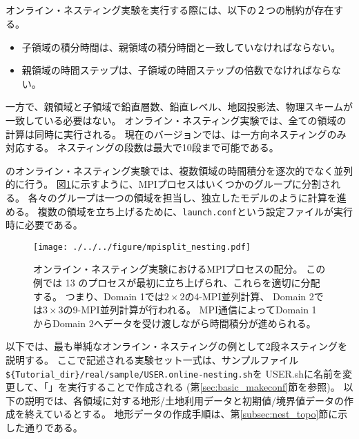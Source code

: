 \subsection{\SubsecOnlineNesting} \label{subsec:nest_online}

オンライン・ネスティング実験を実行する際には、以下の２つの制約が存在する。
\begin{itemize}
\item 子領域の積分時間は、親領域の積分時間と一致していなければならない。
\item 親領域の時間ステップは、子領域の時間ステップの倍数でなければならない。
\end{itemize}
一方で、親領域と子領域で鉛直層数、鉛直レベル、地図投影法、物理スキームが一致している必要はない。
オンライン・ネスティング実験では、全ての領域の計算は同時に実行される。
現在のバージョンでは、\scalerm は一方向ネスティングのみ対応する。
ネスティングの段数は最大で10段まで可能である。

\scalerm のオンライン・ネスティング実験では、複数領域の時間積分を逐次的でなく並列的に行う。
図\ref{fig_mpisplit}に示すように、MPIプロセスはいくつかのグループに分割される。
各々のグループは一つの領域を担当し、独立したモデルのように計算を進める。
複数の領域を立ち上げるために、\verb|launch.conf|という設定ファイルが実行時に必要である。

\begin{figure}[ht]
\begin{center}
  \texttt{[image: ./../../figure/mpisplit\_nesting.pdf]}\\
  \caption{ オンライン・ネスティング実験におけるMPIプロセスの配分。
           この例では 13 のプロセスが最初に立ち上げられ、これらを適切に分配する。
           つまり、Domain 1では$2 \times 2$の4-MPI並列計算、
           Domain 2では$3 \times 3$の9-MPI並列計算が行われる。
           MPI通信によってDomain 1からDomain 2へデータを受け渡しながら時間積分が進められる。}
  \label{fig_mpisplit}
\end{center}
\end{figure}


以下では、最も単純なオンライン・ネスティングの例として2段ネスティングを説明する。
%
ここで記述される実験セット一式は、サンプルファイル
\verb|${Tutorial_dir}/real/sample/USER.online-nesting.sh|を
USER.shに名前を変更して、「\makeconftool」を実行することで作成される
(第\ref{sec:basic_makeconf}節を参照)。
以下の説明では、各領域に対する地形/土地利用データと初期値/境界値データの作成を終えているとする。
地形データの作成手順は、第\ref{subsec:nest_topo}節に示した通りである。

